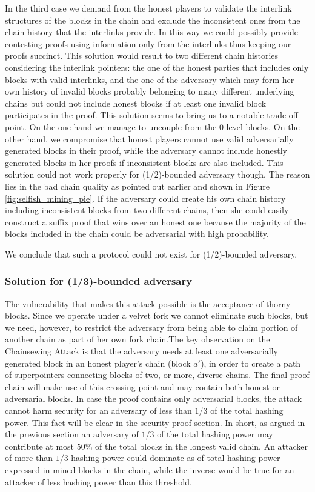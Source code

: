 In the third case we demand from the honest players to validate the interlink
structures of the blocks in the chain and exclude the inconsistent ones from
the chain history that the interlinks provide. In this way we could possibly
provide contesting proofs using information only from the interlinks thus
keeping our proofs succinct. This solution would result to two different
chain histories considering the interlink pointers: the one of the honest
parties that includes only blocks with valid interlinks, and the one of the
adversary which may form her own history of invalid blocks probably belonging
to many different underlying chains but could not include honest blocks if at
least one invalid block participates in the proof. This solution seems to bring
us to a notable trade-off point. On the one hand we manage to uncouple from the
0-level blocks. On the other hand, we compromise that honest players cannot use
valid adversarially generated blocks in their proof, while the adversary cannot
include honestly generated blocks in her proofs if inconsistent blocks are also
included. This solution could not work properly for (1/2)-bounded adversary
though. The reason lies in the bad chain quality as pointed out earlier and shown in
Figure \ref{fig:selfish_mining_pie}. If the adversary  could create his own chain
history including inconsistent blocks from two different chains, then she could
easily construct a suffix proof that wins over an honest one because the majority
of the blocks included in the chain could be adversarial with high probability.

We conclude that such a protocol could not exist for (1/2)-bounded adversary.


\subsubsection{Solution for (1/3)-bounded adversary}
The vulnerability that makes this attack possible is the acceptance of thorny
blocks. Since we operate under a velvet fork we cannot eliminate such blocks, 
but we need, however, to restrict the adversary from being able to claim portion
of another chain as part of her own fork chain.The key observation on the
Chainsewing Attack is that the adversary needs at least one adversarially generated
block in an honest player's chain (block $a'$), in order to create a path of
superpointers connecting blocks of two, or more, diverse chains. The final proof
chain will make use of this crossing point and may contain both honest or
adversarial blocks.
In case the proof contains only adversarial blocks, the attack cannot harm
security for an adversary of less than $1/3$ of the total hashing power. This
fact will be clear in the security proof section. In short, as argued in the
previous section an adversary of $1/3$ of the total hashing power may contribute
at most $ 50\% $ of the total blocks in the longest valid chain. An attacker of
more than $1/3$ hashing power could dominate as of total hashing power expressed
in mined blocks in the chain, while the inverse would be true for an attacker of
less hashing power than this threshold.

